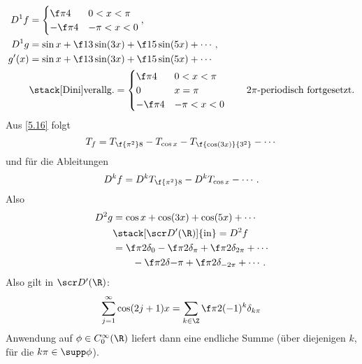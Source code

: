 \begin{ex}
\begin{enumerate}[1)]
			\begin{align*}
				D^1 f &= \begin{cases}
					\f \pi4 & 0 < x < \pi \\
					-\f \pi4 & -\pi < x < 0
				\end{cases}, \\
				D^1 g &= \sin x + \f 1{3} \sin (3x) + \f 15 \sin (5x) + \dotsb, \\
				g'(x) &= \sin x + \f 1{3} \sin (3x) + \f 15 \sin (5x) + \dotsb \\
				&\stack[\text{Dini}]{\text{verallg.}}= \begin{cases}
					\f \pi4 & 0 < x < \pi \\
					0 & x = \pi \\
					-\f \pi4 & -\pi < x < 0
				\end{cases} \qquad \text{$2\pi$-periodisch fortgesetzt}.
			\end{align*}
			Aus \ref{5.16} folgt
			\[
				T_f = T_{\f {\pi^2}8} - T_{\cos x} - T_{\f {\cos (3x)}{3^2}} - \dotsb
			\]
			und für die Ableitungen
			\[
				D^k f = D^k T_{\f {\pi^2}8} - D^k T_{\cos x} - \dotsb.
			\]
			Also
			\begin{align*}
				D^2 g &= \cos x + \cos (3x) + \cos (5x) + \dotsb \\
				&\stack[\scr D'(\R)]{\text{in}}= D^2 f \\
				&= \f \pi 2 \delta_0 - \f \pi2 \delta_\pi + \f \pi2 \delta_{2\pi} + \dotsb \\
				& \qquad - \f \pi 2 \delta{-\pi} + \f \pi 2 \delta_{-2\pi} + \dotsb.
			\end{align*}
			Also gilt in $\scr D'(\R)$:
			\[
				\sum_{j=1}^\infty \cos(2j + 1) x 
				= \sum_{k\in \Z} \f \pi 2 (-1)^k \delta_{k\pi}
			\]
			Anwendung auf $\phi \in C_0^\infty(\R)$ liefert dann eine endliche Summe (über diejenigen $k$, für die $k \pi \in \supp \phi$).
	\end{enumerate}
\end{ex}

